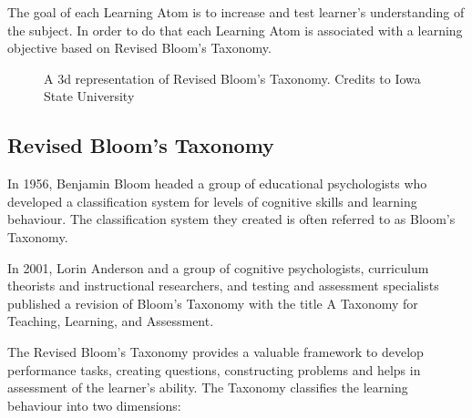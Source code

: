 \documentclass[]{article}
\begin{document}
The goal of each Learning Atom is to increase and test learner's understanding of the subject. In order to do that each Learning Atom is associated with a learning objective based on Revised Bloom’s Taxonomy. 



\begin{figure}
    \caption{A 3d representation of Revised Bloom's Taxonomy. Credits to Iowa State University }
    \label{fig1}
\end{figure}

\subsection[Bloom’s Taxonomy]{Revised Bloom’s Taxonomy}
In 1956, Benjamin Bloom headed a group of educational psychologists who developed a classification system for levels of cognitive skills and learning behaviour. The classification system they created is often referred to as Bloom's Taxonomy\cite{bloom1965bloom}.

In 2001, Lorin Anderson and a group of cognitive psychologists, curriculum theorists and instructional researchers, and testing and assessment specialists published a revision of Bloom’s Taxonomy with the title A Taxonomy for Teaching, Learning, and Assessment\cite{anderson2001taxonomy}.

The Revised Bloom's Taxonomy provides a valuable framework to develop performance tasks, creating questions, constructing problems and helps in assessment of the learner's ability. The Taxonomy classifies the learning behaviour into two dimensions:
\end{document}
